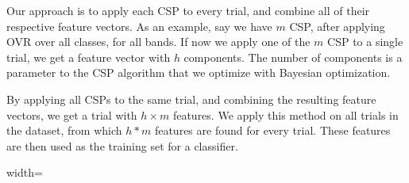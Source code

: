Our approach is to apply each CSP to every trial, and combine all of their respective feature vectors. As an example, say we have $m$ CSP, after applying OVR over all classes, for all bands. If now we apply one of the $m$ CSP to a single trial, we get a feature vector with $h$ components. The number of components is a parameter to the CSP algorithm that we optimize with Bayesian optimization.

By applying all CSPs to the same trial, and combining the resulting feature vectors, we get a trial with $h \times m$ features. We apply this method on all trials in the dataset, from which $h * m$ features are found for every trial. These features are then used as the training set for a classifier.

\begin {figure*}%
\centering
\begin{adjustbox}{width=\textwidth}
\end{adjustbox}
\end{figure*}
